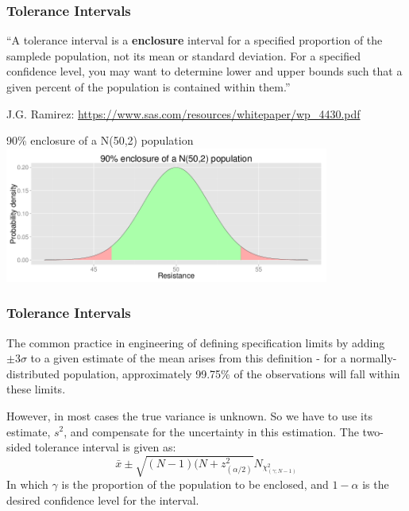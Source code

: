 \documentclass[10pt]{beamer}
\begin{document}
\begin{frame}
  \frametitle{Tolerance Intervals} 

  ``A tolerance interval is a {\bf enclosure} interval for a specified
  proportion of the samplede population, not its mean or standard
  deviation. For a specified confidence level, you may want to
  determine lower and upper bounds such that a given percent of the
  population is contained within them.''

  \hfill{\tiny J.G. Ramirez:
    \url{https://www.sas.com/resources/whitepaper/wp_4430.pdf}}

  \begin{center}
    90\% enclosure of a N(50,2) population
    \includegraphics[width=0.8\textwidth]{img/enclosure}
  \end{center}
\end{frame}

\begin{frame}
  \frametitle{Tolerance Intervals} 
  The common practice in engineering of defining specification limits
  by adding $\pm 3\sigma$ to a given estimate of the mean arises from
  this definition - for a normally-distributed population,
  approximately 99.75\% of the observations will fall within these
  limits.
  
  However, in most cases the true variance is unknown. So we have to
  use its estimate, $s^2$, and compensate for the uncertainty in this
  estimation. The two-sided tolerance interval is given as: 
  \begin{equation*}
    \bar{x} \pm \sqrt{(N-1)(N+z^2_{(\alpha/2)}}{N_{\chi^2_{(\gamma;N-1)}}}
  \end{equation*}
  In which $\gamma$ is the proportion of the population to be
  enclosed, and $1-\alpha$ is the desired confidence level for the
  interval.
\end{frame}
\end{document}
